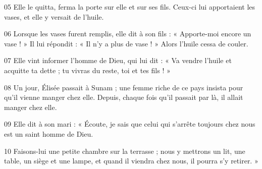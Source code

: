 
05 Elle le quitta, ferma la porte sur elle et sur ses fils. Ceux-ci lui apportaient les vases, et elle y versait de l’huile.

06 Lorsque les vases furent remplis, elle dit à son fils : « Apporte-moi encore un vase ! » Il lui répondit : « Il n’y a plus de vase ! » Alors l’huile cessa de couler.

07 Elle vint informer l’homme de Dieu, qui lui dit : « Va vendre l’huile et acquitte ta dette ; tu vivras du reste, toi et tes fils ! »

08 Un jour, Élisée passait à Sunam ; une femme riche de ce pays insista pour qu’il vienne manger chez elle. Depuis, chaque fois qu’il passait par là, il allait manger chez elle.

09 Elle dit à son mari : « Écoute, je sais que celui qui s’arrête toujours chez nous est un saint homme de Dieu.

10 Faisons-lui une petite chambre sur la terrasse ; nous y mettrons un lit, une table, un siège et une lampe, et quand il viendra chez nous, il pourra s’y retirer. »
